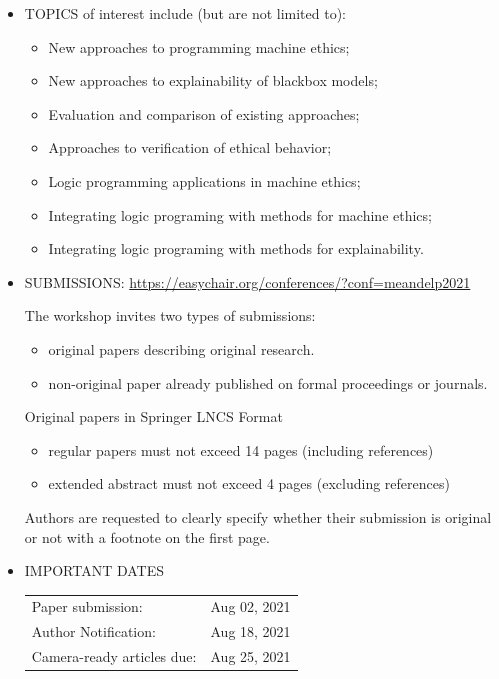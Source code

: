 \documentclass[prodmode,acmtecs]{acmsmall} %
\begin{document}
\begin{itemize}
\item  TOPICS of interest include (but are not limited to):     
 
\begin{itemize}\item  New approaches to programming machine ethics;    
\item  New approaches to explainability of blackbox models;    
\item  Evaluation and comparison of existing approaches;    
\item  Approaches to verification of ethical behavior;    
\item  Logic programming applications in machine ethics;    
\item  Integrating logic programing with methods for machine ethics;    
\item  Integrating logic programing with methods for explainability.                     
\end{itemize} 
\item  SUBMISSIONS: \href{https://easychair.org/conferences/?conf=meandelp2021}{https://easychair.org/conferences/?conf=meandelp2021} 
 
  The workshop invites two types of submissions:  
 
\begin{itemize}\item  original papers describing original research. 
\item  non-original paper already published on formal proceedings or journals.
\end{itemize} 
 Original papers in Springer LNCS Format  
 
\begin{itemize}\item  regular papers must not exceed 14 pages (including references) 
\item  extended abstract must not exceed 4 pages (excluding references)
\end{itemize} 
 Authors are requested to clearly specify whether their submission is original or not with a footnote on the first page. 
 
\item  IMPORTANT DATES 
 
\begin{tabulary}{\linewidth}{LL}Paper submission:  & Aug 02, 2021 \\
Author Notification:  & Aug 18, 2021 \\
Camera-ready articles due:  & Aug 25, 2021 \\
\end{tabulary}
 

\end{itemize}
\end{document}
